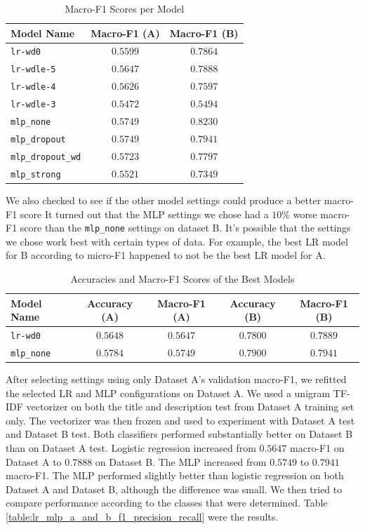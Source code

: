 \documentclass[letterpaper,conference,compsoc,onecolumn]{IEEEtran}
\begin{document}
\begin{table}[h]
  \centering
  \caption{Macro-F1 Scores per Model}
  \label{table:lr_mlp_macrof1_per_settings}
  \begin{tabular}{lcc}
    \hline
    \textbf{Model Name} & \textbf{Macro-F1 (A)} & \textbf{Macro-F1 (B)}\\
    \hline
    \texttt{lr-wd0} & $0.5599$ & $0.7864$\\
    \texttt{lr-wdle-5} & $0.5647$ & $0.7888$\\
    \texttt{lr-wdle-4} & $0.5626$ & $0.7597$\\
    \texttt{lr-wdle-3} & $0.5472$ & $0.5494$\\
    \texttt{mlp\_none} & $0.5749$ & $0.8230$\\
    \texttt{mlp\_dropout} & $0.5749$ & $0.7941$\\
    \texttt{mlp\_dropout\_wd} & $0.5723$ & $0.7797$\\
    \texttt{mlp\_strong} & $0.5521$ & $0.7349$\\
    \hline  
  \end{tabular}
\end{table}

We also checked to see if the other model settings could produce a better macro-F1 score It turned out that the MLP settings we chose had a $10\%$ worse macro-F1 score than the \texttt{mlp\_none} settings on dataset B. It's possible that the settings we chose work best with certain types of data. For example, the best LR model for B according to micro-F1 happened to not be the best LR model for A.

\begin{table}[h]
  \centering
  \caption{Accuracies and Macro-F1 Scores of the Best Models}
  \label{table:lr_mlp_best_accu_macrof1}
  \begin{tabular}{lcccc}
    \hline
    \textbf{Model Name} & \textbf{Accuracy (A)} & \textbf{Macro-F1 (A)} & \textbf{Accuracy (B)} & \textbf{Macro-F1 (B)}\\
    \hline
    \texttt{lr-wd0} & $0.5648$ & $0.5647$ & $0.7800$ & $0.7889$\\
    \texttt{mlp\_none} & $0.5784$ & $0.5749$ & $0.7900$ & $0.7941$\\
    \hline  
  \end{tabular}
\end{table}

After selecting settings using only Dataset A's validation macro-F1, we refitted the selected LR and MLP configurations on Dataset A. We used a unigram TF-IDF vectorizer on both the title and description test from Dataset A training set only. The vectorizer was then frozen and used to experiment with Dataset A test and Dataset B test. 
Both classifiers performed substantially better on Dataset B than on Dataset A test. Logistic regression increased from $0.5647$ macro-F1 on Dataset A to $0.7888$ on Dataset B. The MLP increased from $0.5749$ to $0.7941$ macro-F1. The MLP performed slightly better than logistic regression on both Dataset A and Dataset B, although the difference was small.
We then tried to compare performance according to the classes that were determined. Table \ref{table:lr_mlp_a_and_b_f1_precision_recall} were the results.
\end{document}
